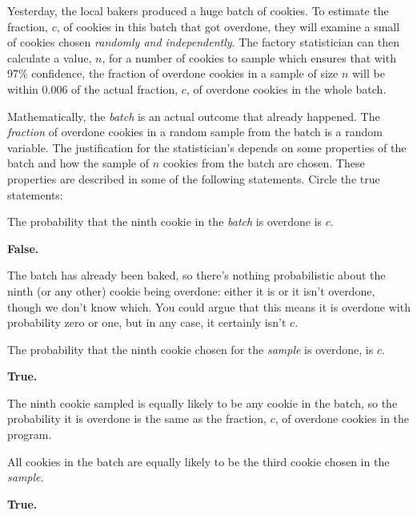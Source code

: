\begin{problem}

  Yesterday, the local bakers produced a huge batch of cookies.  To
  estimate the fraction, $c$, of cookies in this batch that got
  overdone, they will examine a small  of cookies chosen
  \emph{randomly and independently}.  The factory statistician can then
  calculate a value, $n$, for a number of cookies to sample which
  ensures that with 97\% confidence, the fraction of overdone
  cookies in a sample of size $n$ will be within 0.006 of the actual
  fraction, $c$, of overdone cookies in the whole batch.

  Mathematically, the \emph{batch} is an actual outcome that already
  happened.  The \emph{fraction} of overdone cookies in a random sample
  from the batch is a random variable.  The justification for the
  statistician's  depends on some properties of the
  batch and how the sample of $n$ cookies from the batch are chosen.
  These properties are described in some of the following statements.
  Circle the true statements:

\bparts

\ppart The probability that the ninth cookie in the
\emph{batch} is overdone is $c$.

\begin{solution}
\textbf{False.}

The batch has already been baked, so there's nothing probabilistic
about the ninth (or any other) cookie being overdone: either it is
or it isn't overdone, though we don't know which.  You could argue
that this means it is overdone with probability zero or one, but in
any case, it certainly isn't $c$.
\end{solution}

\ppart The probability that the ninth cookie chosen for the
  \emph{sample} is overdone, is $c$.

\begin{solution} \textbf{True.}

The ninth cookie sampled is equally likely to be any cookie in the
batch, so the probability it is overdone is the same as the fraction, $c$,
of overdone cookies in the program.
\end{solution}

\ppart All cookies in the batch are equally likely to be the
third cookie chosen in the \emph{sample}.

\begin{solution} \textbf{True.}


\end{solution}
\end{problem}
